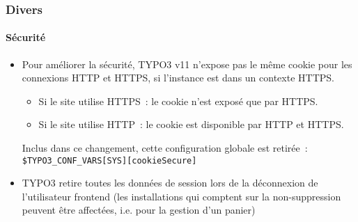 %

\begin{frame}[fragile]
	\frametitle{Divers}
	\framesubtitle{Sécurité}

	\begin{itemize}
		\item Pour améliorer la sécurité, TYPO3 v11 n'expose pas le même cookie
			pour les connexions HTTP et HTTPS, si l'instance est dans un contexte HTTPS.

			\begin{itemize}
				\item Si le site utilise HTTPS~: le cookie n'est exposé que par HTTPS.
				\item Si le site utilise HTTP~: le cookie est disponible par HTTP et HTTPS.
			\end{itemize}

			Inclus dans ce changement, cette configuration globale est retirée~:
		 	\smaller\texttt{\$TYPO3\_CONF\_VARS[SYS][cookieSecure]}\normalsize

		\item TYPO3 retire toutes les données de session lors de la déconnexion de l'utilisateur frontend\newline
			\small(les installations qui comptent sur la non-suppression peuvent être affectées, i.e. pour la gestion d'un panier)\normalsize

	\end{itemize}

\end{frame}

